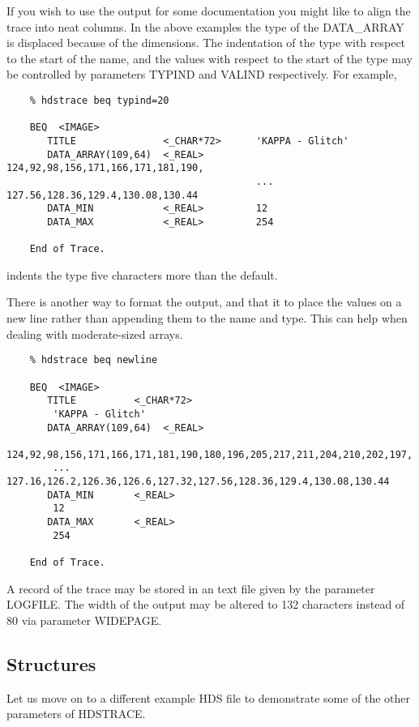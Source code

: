 If you wish to use the output for some documentation you might like
to align the trace into neat columns.  In the above examples the
type of the DATA\_ARRAY is displaced because of the dimensions.  The
indentation of the type with respect to the start of the name, and the
values with respect to the start of the type may be controlled by 
parameters TYPIND and VALIND respectively.  For example,

\small
\begin{verbatim}
    % hdstrace beq typind=20
 
    BEQ  <IMAGE>
       TITLE               <_CHAR*72>      'KAPPA - Glitch'
       DATA_ARRAY(109,64)  <_REAL>         124,92,98,156,171,166,171,181,190,
                                           ... 127.56,128.36,129.4,130.08,130.44
       DATA_MIN            <_REAL>         12
       DATA_MAX            <_REAL>         254

    End of Trace.
\end{verbatim}
\normalsize
indents the type five characters more than the default.

There is another way to format the output, and that it to place the
values on a new line rather than appending them to the name and type.
This can help when dealing with moderate-sized arrays.

\small
\begin{verbatim}
    % hdstrace beq newline
 
    BEQ  <IMAGE>
       TITLE          <_CHAR*72>   
        'KAPPA - Glitch'
       DATA_ARRAY(109,64)  <_REAL>   
        124,92,98,156,171,166,171,181,190,180,196,205,217,211,204,210,202,197,
        ... 127.16,126.2,126.36,126.6,127.32,127.56,128.36,129.4,130.08,130.44
       DATA_MIN       <_REAL>   
        12
       DATA_MAX       <_REAL>   
        254

    End of Trace.
\end{verbatim}
\normalsize
A record of the trace may be stored in an text file given by the 
parameter LOGFILE.  The width of the output may be altered to 132
characters instead of 80 via parameter WIDEPAGE.

\subsection{Structures}

Let us move on to a different example HDS file to demonstrate some of
the other parameters of {\footnotesize HDSTRACE}.

